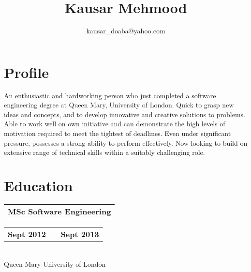 \documentclass[a4paper]{article}
\title{Kausar Mehmood}
\author{kausar\_doaba@yahoo.com}
\date{}
\begin{document}
            
            \maketitle
            
            \section*{Profile}
                An enthusiastic and hardworking person who just completed a software engineering degree at Queen Mary, University of London. Quick to grasp new ideas and concepts, and to develop innovative and creative solutions to problems. Able to work well on own initiative and can demonstrate the high levels of motivation required to meet the tightest of deadlines. Even under significant pressure, possesses a strong ability to perform effectively. Now looking to build on extensive range of technical skills within a suitably challenging role.
            
            
            
            \section*{Education}
                \begin{tabular}[t]{@{}l} 
                    \textbf{MSc Software Engineering}
                \end{tabular}
                \hfill
                \begin{tabular}[t]{l@{}}
                    \textbf{Sept 2012 --- Sept 2013}
                \end{tabular}\\
                Queen Mary University of London
        
\end{document}
